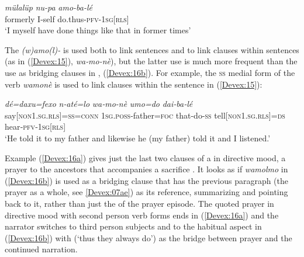 \documentclass[output=paper]{LSP/langsci}
\begin{document}
\begin{exe}
\ex \label{Devex:14}
\gll \textit{mülalüp} \textit{nu-pa} \textit{amo-ba-lé}\\
formerly I-self do.thus-\textsc{pfv-1sg[rls]}\\
\glt `I myself have done things like that in former times'\\      	
\end{exe}

The  \textit{(w)amo(l)-} is used both to link sentences and to link clauses within sentences (as in (\ref{Devex:15}), \textit{wa‑mo-nè}), but the latter use is much more frequent than the use as bridging clauses in , (\ref{Devex:16b}). For example, the \textsc{ss} medial form of the verb \textit{wamonè} is used to link clauses within the sentence in (\ref{Devex:15}):


\begin{exe}
\ex \label{Devex:15}	     
\gll \textit{dé=daxu=fexo} \textit{n‑até=lo} \textit{wa‑mo-nè} \textit{umo=do} \textit{dai‑ba‑lé}\\
say[\textsc{non1.sg.rls}]=\textsc{ss=conn} \textsc{1sg.poss}‑father=\textsc{foc} that-do-\textsc{ss}  		tell[\textsc{non1.sg.rls}]=\textsc{ds} hear‑\textsc{pfv‑1sg[rls]}\\
\glt `He told it to my father and likewise he (my father) told it and I listened.'\\	     
\end{exe}
	     
Example (\ref{Devex:16a}) gives just the last two clauses of a  in directive mood, a prayer to the ancestors that accompanies a sacrifice \citep[see examples (8--22) in][160--162]{enk97}. It looks as if \textit{wamolmo} in (\ref{Devex:16b}) is used as a bridging clause that has the previous paragraph (the prayer as a whole, see \ref{Devex:07ae}) as its reference, summarizing and pointing back to it, rather than just the  of the prayer episode. The quoted prayer in directive mood with second person verb forms ends in (\ref{Devex:16a}) and the narrator switches to third person subjects and to the habitual aspect in (\ref{Devex:16b}) with  (`thus they always do') as the bridge between prayer and the continued narration.
	     
\end{document}
